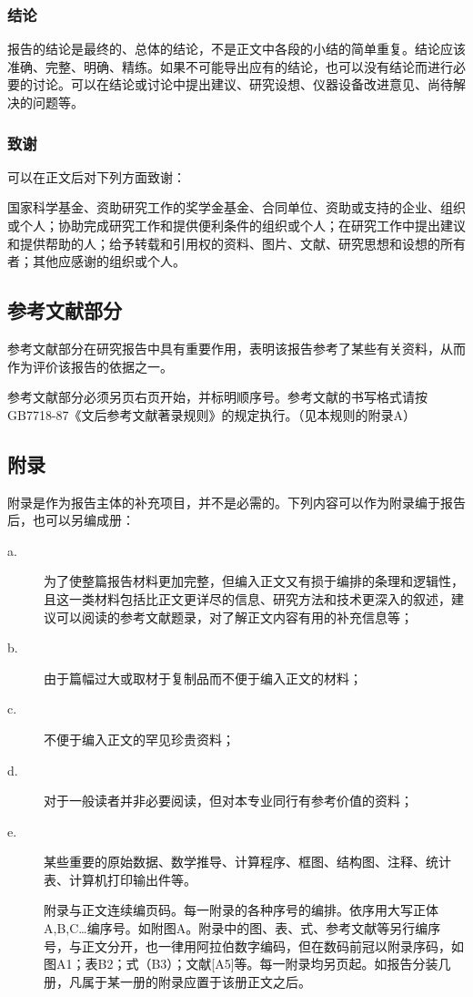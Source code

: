 \subsubsection{结论}

报告的结论是最终的、总体的结论，不是正文中各段的小结的简单重复。结论应该准确、完整、明确、精练。如果不可能导出应有的结论，也可以没有结论而进行必要的讨论。可以在结论或讨论中提出建议、研究设想、仪器设备改进意见、尚待解决的问题等。


\subsubsection{致谢}

可以在正文后对下列方面致谢：

国家科学基金、资助研究工作的奖学金基金、合同单位、资助或支持的企业、组织或个人；协助完成研究工作和提供便利条件的组织或个人；在研究工作中提出建议和提供帮助的人；给予转载和引用权的资料、图片、文献、研究思想和设想的所有者；其他应感谢的组织或个人。


\subsection{参考文献部分}

参考文献部分在研究报告中具有重要作用，表明该报告参考了某些有关资料，从而作为评价该报告的依据之一。

参考文献部分必须另页右页开始，并标明顺序号。参考文献的书写格式请按GB7718-87《文后参考文献著录规则》的规定执行。（见本规则的附录A）


\subsection{附录}

附录是作为报告主体的补充项目，并不是必需的。下列内容可以作为附录编于报告后，也可以另编成册：

\begin{description}

\item[a.] 为了使整篇报告材料更加完整，但编入正文又有损于编排的条理和逻辑性，且这一类材料包括比正文更详尽的信息、研究方法和技术更深入的叙述，建议可以阅读的参考文献题录，对了解正文内容有用的补充信息等；

\item[b.] 由于篇幅过大或取材于复制品而不便于编入正文的材料；

\item[c.] 不便于编入正文的罕见珍贵资料；

\item[d.] 对于一般读者并非必要阅读，但对本专业同行有参考价值的资料；

\item[e.] 某些重要的原始数据、数学推导、计算程序、框图、结构图、注释、统计表、计算机打印输出件等。

附录与正文连续编页码。每一附录的各种序号的编排。依序用大写正体A,B,C…编序号。如附图A。附录中的图、表、式、参考文献等另行编序号，与正文分开，也一律用阿拉伯数字编码，但在数码前冠以附录序码，如图A1；表B2；式（B3）；文献[A5]等。每一附录均另页起。如报告分装几册，凡属于某一册的附录应置于该册正文之后。

\end{description}


